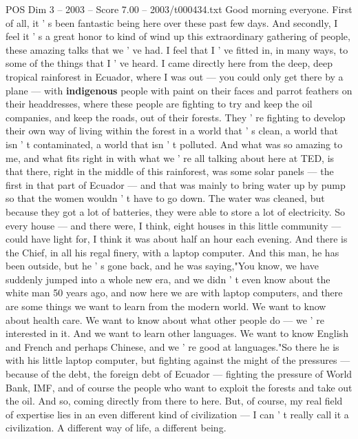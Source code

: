 \begin{textsample}{POS Dim 3 – 2003 – Score 7.00 – 2003/t000434.txt}  \label{ex:f3_pos_074}
Good morning everyone.
First of all, it ' s been fantastic being here over these past few days.
And secondly, I feel it ' s a great honor to kind of wind up this extraordinary gathering of people, these amazing talks that we ' ve had.
I feel that I ' ve fitted in, in many ways, to some of the things that I ' ve heard.
I came directly here from the deep, deep tropical rainforest in Ecuador, where I was out — you could only get there by a plane — with \textbf{indigenous} people with paint on their faces and parrot feathers on their headdresses, where these people are fighting to try and keep the oil companies, and keep the roads, out of their forests.
They ' re fighting to develop their own way of living within the forest in a world that ' s clean, a world that isn ' t contaminated, a world that isn ' t polluted.
And what was so amazing to me, and what fits right in with what we ' re all talking about here at TED, is that there, right in the middle of this rainforest, was some solar panels — the first in that part of Ecuador — and that was mainly to bring water up by pump so that the women wouldn ' t have to go down.
The water was cleaned, but because they got a lot of batteries, they were able to store a lot of electricity.
So every house — and there were, I think, eight houses in this little community — could have light for, I think it was about half an hour each evening.
And there is the Chief, in all his regal finery, with a laptop computer.
And this man, he has been outside, but he ' s gone back, and he was saying,"You know, we have suddenly jumped into a whole new era, and we didn ' t even know about the white man 50 years ago, and now here we are with laptop computers, and there are some things we want to learn from the modern world.
We want to know about health care.
We want to know about what other people do — we ' re interested in it.
And we want to learn other languages.
We want to know English and French and perhaps Chinese, and we ' re good at languages."So there he is with his little laptop computer, but fighting against the might of the pressures — because of the debt, the foreign debt of Ecuador — fighting the pressure of World Bank, IMF, and of course the people who want to exploit the forests and take out the oil.
And so, coming directly from there to here.
But, of course, my real field of expertise lies in an even different kind of civilization — I can ' t really call it a civilization.
A different way of life, a different being.

\end{textsample}
